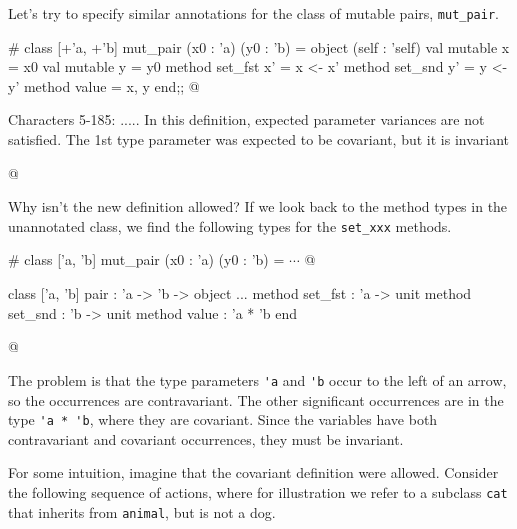 Let's try to specify similar annotations for the class of mutable
pairs, \hbox{\lstinline$mut_pair$}.

\begin{ocaml}
# class [+'a, +'b] mut_pair (x0 : 'a) (y0 : 'b) =
    object (self : 'self)
      val mutable x = x0
      val mutable y = y0
      method set_fst x' = x <- x'
      method set_snd y' = y <- y'
      method value = x, y
    end;;
@
\begin{toperror}
Characters 5-185: .....
In this definition, expected parameter variances are not satisfied.
The 1st type parameter was expected to be covariant,
but it is invariant
\end{toperror}
@
\end{ocaml}
%
Why isn't the new definition allowed?  If we look back to the
method types in the unannotated class, we find the following
types for the \hbox{\lstinline$set_xxx$} methods.

\begin{ocaml}
# class ['a, 'b] mut_pair (x0 : 'a) (y0 : 'b) = $\cdots$
@
\begin{topoutput}
class ['a, 'b] pair : 'a -> 'b ->
  object
    ...
    method set_fst : 'a -> unit
    method set_snd : 'b -> unit
    method value : 'a * 'b
  end
\end{topoutput}
@
\end{ocaml}
%
The problem is that the 
type parameters \hbox{\lstinline$'a$} and \hbox{\lstinline$'b$} occur to the left of an
arrow, so the occurrences are contravariant.  The other significant
occurrences are in the type \hbox{\lstinline$'a * 'b$}, where they are covariant.
Since the variables have both contravariant and covariant occurrences,
they must be invariant.

For some intuition, imagine that the covariant definition were
allowed.  Consider the following sequence of actions, where for
illustration we refer to a subclass \hbox{\lstinline$cat$} that inherits
from \hbox{\lstinline$animal$}, but is not a dog.

